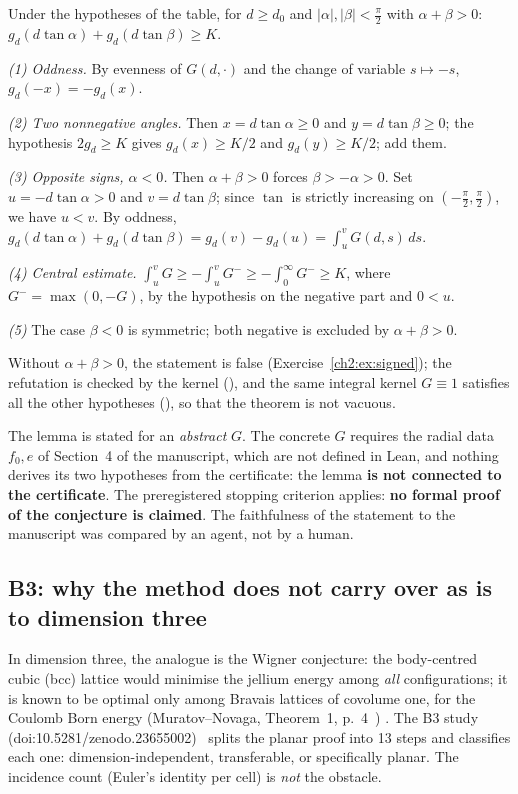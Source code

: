 \begin{theorem}\label{ch2:thm:signed}
Under the hypotheses of the table, for $d\ge d_0$ and $|\alpha|,|\beta|<\frac\pi2$ with $\alpha+\beta>0$:
$g_d(d\tan\alpha)+g_d(d\tan\beta)\ge K$. \tierAs
\end{theorem}
\begin{humanproof}
\emph{(1) Oddness.} By evenness of $G(d,\cdot)$ and the change of variable $s\mapsto-s$, $g_d(-x)=-g_d(x)$.

\emph{(2) Two nonnegative angles.} Then $x=d\tan\alpha\ge0$ and $y=d\tan\beta\ge0$; the hypothesis $2g_d\ge K$ gives
$g_d(x)\ge K/2$ and $g_d(y)\ge K/2$; add them.

\emph{(3) Opposite signs, $\alpha<0$.} Then $\alpha+\beta>0$ forces $\beta>-\alpha>0$. Set $u=-d\tan\alpha>0$ and
$v=d\tan\beta$; since $\tan$ is strictly increasing on $(-\frac\pi2,\frac\pi2)$, we have $u<v$. By oddness,
$g_d(d\tan\alpha)+g_d(d\tan\beta)=g_d(v)-g_d(u)=\int_u^vG(d,s)\,ds$.

\emph{(4) Central estimate.} $\int_u^vG\ge-\int_u^vG^-\ge-\int_0^\infty G^-\ge K$, where $G^-=\max(0,-G)$, by
the hypothesis on the negative part and $0<u$.

\emph{(5)} The case $\beta<0$ is symmetric; both negative is excluded by $\alpha+\beta>0$.
\end{humanproof}
\noindent Without $\alpha+\beta>0$, the statement is false (Exercise~\ref{ch2:ex:signed}); the refutation is checked by the
kernel (), and the same integral kernel $G\equiv1$ satisfies all the other hypotheses
(), so that the theorem is not vacuous.

\begin{warnbox}
The lemma is stated for an \emph{abstract} $G$. The concrete $G$ requires the radial data $f_0,e$ of Section~4 of the
manuscript, which are not defined in Lean, and nothing derives its two hypotheses from the certificate: the lemma \textbf{is
not connected to the certificate}. The preregistered stopping criterion applies: \textbf{no formal proof of the conjecture
is claimed}. The faithfulness of the statement to the manuscript was compared by an agent, not by a human.
\end{warnbox}

\subsection{B3: why the method does not carry over as is to dimension three}\label{ch2:ssec:b3}
In dimension three, the analogue is the Wigner conjecture: the body-centred cubic (bcc) lattice would minimise the
jellium energy among \emph{all} configurations; it is known to be optimal only among Bravais lattices of covolume one, for the Coulomb Born energy (Muratov--Novaga, Theorem~1, p.~4~\cite{ch2mn})
\tierL. The B3 study (doi\string:10.5281/zenodo.23655002)~\cite{ch2b3} splits the planar proof into 13 steps and classifies each one:
dimension-independent, transferable, or specifically planar. The incidence count (Euler's identity per
cell) is \emph{not} the obstacle.

